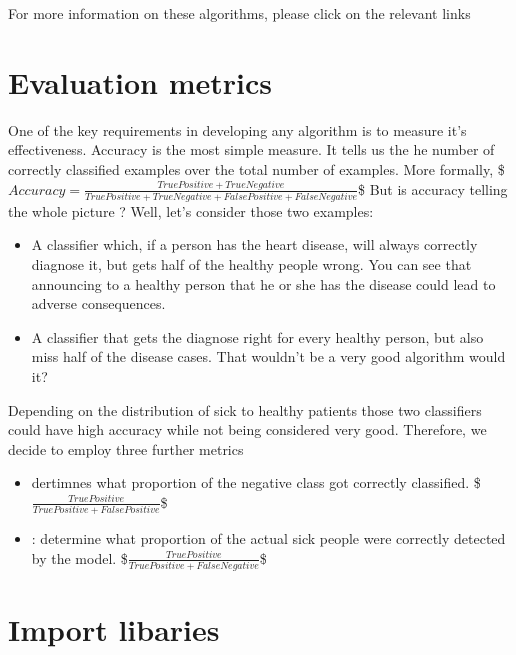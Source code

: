\documentclass[letterpaper,10pt,english]{jupyterBook}
\begin{document}
\sphinxAtStartPar
For more information on these algorithms, please click on the relevant links


\section{Evaluation metrics}
\label{\detokenize{Model_evaluation:evaluation-metrics}}
\sphinxAtStartPar
One of the key requirements in developing any algorithm is to measure it’s effectiveness. Accuracy is the most simple measure. It tells us the he number of correctly classified examples over the total number of examples. More formally,
\$\(
 Accuracy = \frac{TruePositive + TrueNegative}{TruePositive + TrueNegative + FalsePositive + FalseNegative  }
\)\$
But is accuracy telling the whole picture ?
Well, let’s consider those two examples:
\begin{itemize}
\item {} 
\sphinxAtStartPar
A classifier which, if a person has the heart disease, will always correctly diagnose it, but gets half of the healthy people wrong. You can see that announcing to a healthy person that he or she has the disease could lead to adverse consequences.

\item {} 
\sphinxAtStartPar
A classifier that gets the diagnose right for every healthy person, but also miss half of the disease cases. That wouldn’t be a very good algorithm would it?

\end{itemize}

\sphinxAtStartPar
Depending on the distribution of sick to healthy patients those two classifiers could have high accuracy while not being considered very good. Therefore, we decide to employ three further metrics
\begin{itemize}
\item {} 
\sphinxAtStartPar
{} dertimnes what proportion of the negative class got correctly classified.
\$\(
\frac{TruePositive}{TruePositive +   FalsePositive    }
\)\$

\item {} 
\sphinxAtStartPar
{}: determine what proportion of the actual sick people were correctly detected by the model.
\$\(
\frac{TruePositive}{TruePositive +    FalseNegative   }
\)\$

\end{itemize}


\section{Import libaries}
\label{\detokenize{Model_evaluation:import-libaries}}
\end{document}
